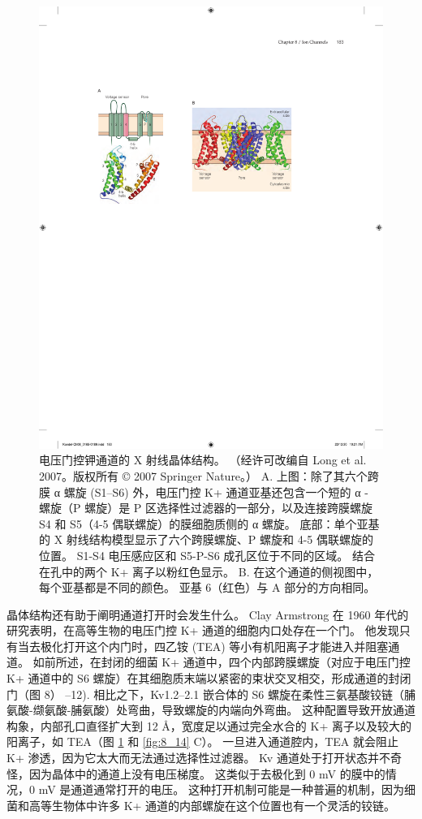 \begin{figure}[htbp]
	\centering
	\includegraphics[width=0.5\linewidth]{chap08/fig_8_13}
	\caption{电压门控钾通道的 X 射线晶体结构。 （经许可改编自 Long et al. 2007。版权所有 © 2007 Springer Nature。） A. 上图：除了其六个跨膜 α 螺旋 (S1–S6) 外，电压门控 K+ 通道亚基还包含一个短的 α - 螺旋（P 螺旋）是 P 区选择性过滤器的一部分，以及连接跨膜螺旋 S4 和 S5（4-5 偶联螺旋）的膜细胞质侧的 α 螺旋。 底部：单个亚基的 X 射线结构模型显示了六个跨膜螺旋、P 螺旋和 4-5 偶联螺旋的位置。 S1-S4 电压感应区和 S5-P-S6 成孔区位于不同的区域。 结合在孔中的两个 K+ 离子以粉红色显示。 B. 在这个通道的侧视图中，每个亚基都是不同的颜色。 亚基 6（红色）与 A 部分的方向相同。}
	\label{fig:8_13}
\end{figure}


晶体结构还有助于阐明通道打开时会发生什么。 
Clay Armstrong 在 1960 年代的研究表明，在高等生物的电压门控 K+ 通道的细胞内口处存在一个门。 
他发现只有当去极化打开这个内门时，四乙铵 (TEA) 等小有机阳离子才能进入并阻塞通道。 
如前所述，在封闭的细菌 K+ 通道中，四个内部跨膜螺旋（对应于电压门控 K+ 通道中的 S6 螺旋）在其细胞质末端以紧密的束状交叉相交，形成通道的封闭门（图 8） –12). 相比之下，Kv1.2–2.1 嵌合体的 S6 螺旋在柔性三氨基酸铰链（脯氨酸-缬氨酸-脯氨酸）处弯曲，导致螺旋的内端向外弯曲。 
这种配置导致开放通道构象，内部孔口直径扩大到 12 Å，宽度足以通过完全水合的 K+ 离子以及较大的阳离子，如 TEA（图 \ref{fig:8_13} 和 \ref{fig:8_14} C）。 
一旦进入通道腔内，TEA 就会阻止 K+ 渗透，因为它太大而无法通过选择性过滤器。 
Kv 通道处于打开状态并不奇怪，因为晶体中的通道上没有电压梯度。 
这类似于去极化到 0 mV 的膜中的情况，0 mV 是通道通常打开的电压。 
这种打开机制可能是一种普遍的机制，因为细菌和高等生物体中许多 K+ 通道的内部螺旋在这个位置也有一个灵活的铰链。

